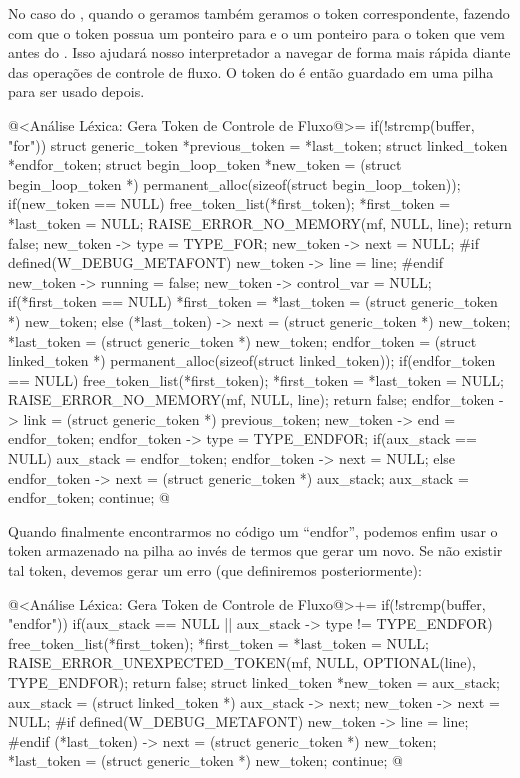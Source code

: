 No caso do , quando o geramos também geramos o token
 correspondente, fazendo com que o
token  possua um ponteiro para  e
o  um ponteiro para o token que vem antes
do . Isso ajudará nosso interpretador a navegar de
forma mais rápida diante das operações de controle de fluxo. O token
do  é então guardado em uma pilha para ser usado
depois.

\iniciocodigo
@<Análise Léxica: Gera Token de Controle de Fluxo@>=
if(!strcmp(buffer, "for")){
  struct generic_token *previous_token = *last_token;
  struct linked_token *endfor_token;
  struct begin_loop_token *new_token = (struct begin_loop_token *)
                              permanent_alloc(sizeof(struct begin_loop_token));
  if(new_token == NULL){
    free_token_list(*first_token);
    *first_token = *last_token = NULL;
    RAISE_ERROR_NO_MEMORY(mf, NULL, line);
    return false;
  }
  new_token -> type = TYPE_FOR;
  new_token -> next = NULL;
#if defined(W_DEBUG_METAFONT)
  new_token -> line = line;
#endif
  new_token -> running = false;
  new_token -> control_var = NULL;
  if(*first_token == NULL)
    *first_token = *last_token = (struct generic_token *) new_token;
  else{
    (*last_token) -> next = (struct generic_token *) new_token;
    *last_token = (struct generic_token *) new_token;
  }
  endfor_token = (struct linked_token *)
                                  permanent_alloc(sizeof(struct linked_token));
  if(endfor_token == NULL){
    free_token_list(*first_token);
    *first_token = *last_token = NULL;
    RAISE_ERROR_NO_MEMORY(mf, NULL, line);
    return false;
  }
  endfor_token -> link = (struct generic_token *) previous_token;
  new_token -> end = endfor_token;
  endfor_token -> type = TYPE_ENDFOR;
  if(aux_stack == NULL){
    aux_stack = endfor_token;
    endfor_token -> next = NULL;
  }
  else{
    endfor_token -> next = (struct generic_token *) aux_stack;
    aux_stack = endfor_token;
  }
  continue;
}
@
\fimcodigo

Quando finalmente encontrarmos no código um ``endfor'', podemos enfim
usar o token armazenado na pilha ao invés de termos que gerar um
novo. Se não existir tal token, devemos gerar um erro (que definiremos
posteriormente):

\iniciocodigo
@<Análise Léxica: Gera Token de Controle de Fluxo@>+=
if(!strcmp(buffer, "endfor")){
  if(aux_stack == NULL || aux_stack -> type != TYPE_ENDFOR){
    free_token_list(*first_token);
    *first_token = *last_token = NULL;
    RAISE_ERROR_UNEXPECTED_TOKEN(mf, NULL, OPTIONAL(line), TYPE_ENDFOR);
    return false;
  }
  struct linked_token *new_token = aux_stack;
  aux_stack = (struct linked_token *) aux_stack -> next;
  new_token -> next = NULL;
#if defined(W_DEBUG_METAFONT)
  new_token -> line = line;
#endif
  (*last_token) -> next = (struct generic_token *) new_token;
  *last_token = (struct generic_token *) new_token;
  continue;
}
@
\fimcodigo

